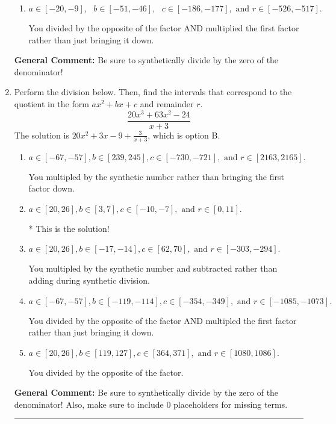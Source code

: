 \documentclass{extbook}[14pt]
\newcommand{\litem}[1]{\item #1

\rule{\textwidth}{0.4pt}}
\begin{document}
\begin{enumerate}
{\begin{enumerate}[label=\Alph*.]
 You divided by the opposite of the factor.
\item \( a \in [-20, -9], \text{   } b \in [-51, -46], \text{   } c \in [-186, -177], \text{   and   } r \in [-526, -517]. \)

 You divided by the opposite of the factor AND multiplied the first factor rather than just bringing it down.
\end{enumerate}

\textbf{General Comment:} Be sure to synthetically divide by the zero of the denominator!
}
\litem{
Perform the division below. Then, find the intervals that correspond to the quotient in the form $ax^2+bx+c$ and remainder $r$.
\[ \frac{20x^{3} +63 x^{2} -24}{x + 3} \]The solution is \( 20x^{2} +3 x -9 + \frac{3}{x + 3} \), which is option B.\begin{enumerate}[label=\Alph*.]
\item \( a \in [-67, -57], b \in [239, 245], c \in [-730, -721], \text{ and } r \in [2163, 2165]. \)

 You multipled by the synthetic number rather than bringing the first factor down.
\item \( a \in [20, 26], b \in [3, 7], c \in [-10, -7], \text{ and } r \in [0, 11]. \)

* This is the solution!
\item \( a \in [20, 26], b \in [-17, -14], c \in [62, 70], \text{ and } r \in [-303, -294]. \)

 You multipled by the synthetic number and subtracted rather than adding during synthetic division.
\item \( a \in [-67, -57], b \in [-119, -114], c \in [-354, -349], \text{ and } r \in [-1085, -1073]. \)

 You divided by the opposite of the factor AND multipled the first factor rather than just bringing it down.
\item \( a \in [20, 26], b \in [119, 127], c \in [364, 371], \text{ and } r \in [1080, 1086]. \)

 You divided by the opposite of the factor.
\end{enumerate}

\textbf{General Comment:} Be sure to synthetically divide by the zero of the denominator! Also, make sure to include 0 placeholders for missing terms.
}
\end{enumerate}
\end{document}
